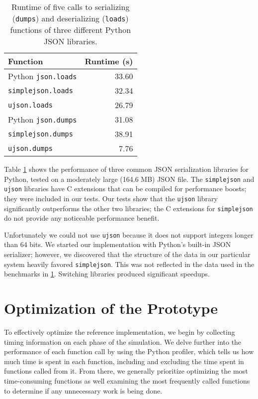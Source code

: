 \begin{table}[htbp]
\centering
\begin{tabular}{l | r}
  \textbf{Function} & \textbf{Runtime (s)} \\
  \hline
  Python \texttt{json.loads} & 33.60 \\
  \texttt{simplejson.loads} & 32.34 \\
  \texttt{ujson.loads} & 26.79 \\
  \hline
  Python \texttt{json.dumps} & 31.08 \\
  \texttt{simplejson.dumps} & 38.91 \\
  \texttt{ujson.dumps} & 7.76
\end{tabular}
\caption[Performance measurements of JSON serializers]{Runtime of five calls to serializing (\texttt{dumps}) and deserializing (\texttt{loads}) functions of three different Python JSON libraries.}
\label{table:perf:json}
\end{table}

Table \ref{table:perf:json} shows the performance of three common JSON serialization libraries for Python, tested on a moderately large (164.6 MB) JSON file. The \texttt{simplejson} and \texttt{ujson} libraries have C extensions that can be compiled for performance boosts; they were included in our tests. Our tests show that the \texttt{ujson} library significantly outperforms the other two libraries; the C extensions for \texttt{simplejson} do not provide any noticeable performance benefit.

Unfortunately we could not use \texttt{ujson} because it does not support integers longer than 64 bits. We started our implementation with Python's built-in JSON serializer; however, we discovered that the structure of the data in our particular system heavily favored \texttt{simplejson}. This was not reflected in the data used in the benchmarks in \ref{table:perf:json}. Switching libraries produced significant speedups.

\section{Optimization of the Prototype} \label{perf:optimizations}

To effectively optimize the reference implementation, we begin by collecting timing information on each phase of the simulation. We delve further into the performance of each function call by using the Python profiler, which tells us how much time is spent in each function, including and excluding the time spent in functions called from it. From there, we generally prioritize optimizing the most time-consuming functions as well examining the most frequently called functions to determine if any unnecessary work is being done.

